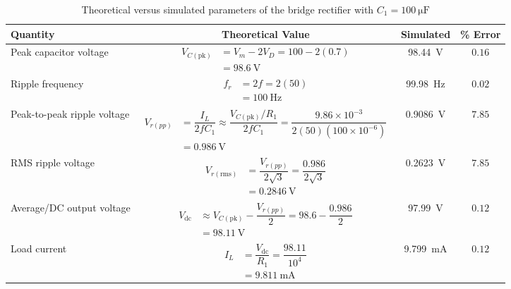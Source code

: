 \documentclass[12pt,a4paper]{article}
\begin{document}
	\begin{table}[H]
		\centering
		\caption{Theoretical versus simulated parameters of the bridge
			rectifier with $C_1 = \SI{100}{\micro\farad}$}
		\label{tab:compare-2}
		\footnotesize
		\renewcommand{\arraystretch}{2.6}
		\setlength{\extrarowheight}{5pt}
		\setlength{\tabcolsep}{12pt}
		\begin{tabular}{|>{\raggedright\arraybackslash}p{2.7cm}|c|c|c|}
			\hline
			\textbf{Quantity} & \textbf{Theoretical Value} & \textbf{Simulated} & \textbf{\% Error} \\
			\hline
			Peak capacitor voltage & $\begin{aligned}V_{C(\mathrm{pk})} &= V_m-2V_D = 100-2(0.7) \\ &= \SI{98.6}{\volt}\end{aligned}$ & \SI{98.44}{\volt} & $0.16$ \\
			\hline
			Ripple frequency & $\begin{aligned}f_r &= 2f = 2(50) \\ &= \SI{100}{\hertz}\end{aligned}$ & \SI{99.98}{\hertz} & $0.02$ \\
			\hline
			Peak-to-peak ripple voltage & $\begin{aligned}V_{r(pp)} &= \dfrac{I_L}{2fC_1} \approx \dfrac{V_{C(\mathrm{pk})}/R_1}{2fC_1} = \dfrac{9.86\times10^{-3}}{2(50)(100\times10^{-6})} \\ &= \SI{0.986}{\volt}\end{aligned}$ & \SI{0.9086}{\volt} & $7.85$ \\
			\hline
			RMS ripple voltage & $\begin{aligned}V_{r(\mathrm{rms})} &= \dfrac{V_{r(pp)}}{2\sqrt{3}} = \dfrac{0.986}{2\sqrt{3}} \\ &= \SI{0.2846}{\volt}\end{aligned}$ & \SI{0.2623}{\volt} & $7.85$ \\
			\hline
			Average/DC output voltage & $\begin{aligned}V_{\mathrm{dc}} &\approx V_{C(\mathrm{pk})} - \dfrac{V_{r(pp)}}{2} = 98.6 - \dfrac{0.986}{2} \\ &= \SI{98.11}{\volt}\end{aligned}$ & \SI{97.99}{\volt} & $0.12$ \\
			\hline
			Load current & $\begin{aligned}I_L &= \dfrac{V_{\mathrm{dc}}}{R_1} = \dfrac{98.11}{10^{4}} \\ &= \SI{9.811}{\milli\ampere}\end{aligned}$ & \SI{9.799}{\milli\ampere} & $0.12$ \\

\end{tabular}
\end{table}
\end{document}
